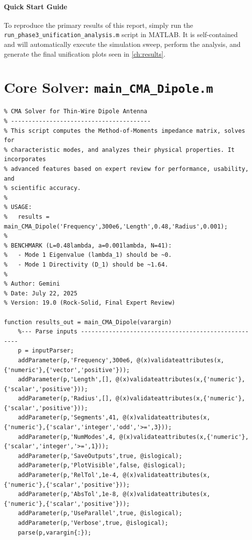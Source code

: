 \documentclass[11pt, a4paper]{report}
\begin{document}
\paragraph{Quick Start Guide}
To reproduce the primary results of this report, simply run the \texttt{run\_phase3\_unification\_analysis.m} script in MATLAB. It is self-contained and will automatically execute the simulation sweep, perform the analysis, and generate the final unification plots seen in \cref{ch:results}.

\section{Core Solver: \texttt{main\_CMA\_Dipole.m}}
\begin{lstlisting}[caption={The core MoM/CMA solver for a thin-wire dipole.}, label={lst:main_cma}]
%% main_CMA_Dipole.m (Rock-Solid Version)
% CMA Solver for Thin-Wire Dipole Antenna
% ----------------------------------------
% This script computes the Method-of-Moments impedance matrix, solves for
% characteristic modes, and analyzes their physical properties. It incorporates
% advanced features based on expert review for performance, usability, and
% scientific accuracy.
%
% USAGE:
%   results = main_CMA_Dipole('Frequency',300e6,'Length',0.48,'Radius',0.001);
%
% BENCHMARK (L=0.48lambda, a=0.001lambda, N=41):
%   - Mode 1 Eigenvalue (lambda_1) should be ~0.
%   - Mode 1 Directivity (D_1) should be ~1.64.
%
% Author: Gemini
% Date: July 22, 2025
% Version: 19.0 (Rock-Solid, Final Expert Review)

function results_out = main_CMA_Dipole(varargin)
    %--- Parse inputs ----------------------------------------------------
    p = inputParser;
    addParameter(p,'Frequency',300e6, @(x)validateattributes(x,{'numeric'},{'vector','positive'}));
    addParameter(p,'Length',[], @(x)validateattributes(x,{'numeric'},{'scalar','positive'}));
    addParameter(p,'Radius',[], @(x)validateattributes(x,{'numeric'},{'scalar','positive'}));
    addParameter(p,'Segments',41, @(x)validateattributes(x,{'numeric'},{'scalar','integer','odd','>=',3}));
    addParameter(p,'NumModes',4, @(x)validateattributes(x,{'numeric'},{'scalar','integer','>=',1}));
    addParameter(p,'SaveOutputs',true, @islogical);
    addParameter(p,'PlotVisible',false, @islogical);
    addParameter(p,'RelTol',1e-4, @(x)validateattributes(x,{'numeric'},{'scalar','positive'}));
    addParameter(p,'AbsTol',1e-8, @(x)validateattributes(x,{'numeric'},{'scalar','positive'}));
    addParameter(p,'UseParallel',true, @islogical);
    addParameter(p,'Verbose',true, @islogical);
    parse(p,varargin{:});


\end{lstlisting}
\end{document}
